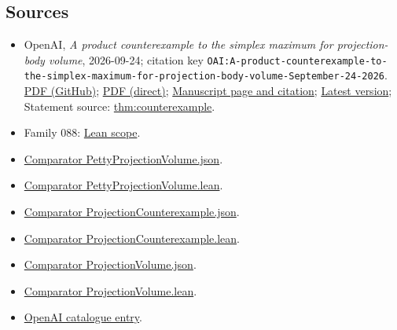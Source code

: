 \documentclass[11pt]{article}
\begin{document}
\subsection{Sources}
\begin{itemize}
\item OpenAI, \emph{A product counterexample to the simplex maximum for projection-body volume}, 2026-09-24; citation key \texttt{OAI:A-product-counterexample-to-the-simplex-maximum-for-projection-body-volume-September-24-2026}. \href{https://github.com/openai/math/blob/adc7f1241b42e322a6451854ab7e4b4c146bf78a/preprints/A-product-counterexample-to-the-simplex-maximum-for-projection-body-volume-September-24-2026/paper.pdf}{PDF (GitHub)}; \href{https://github.com/openai/math/raw/adc7f1241b42e322a6451854ab7e4b4c146bf78a/preprints/A-product-counterexample-to-the-simplex-maximum-for-projection-body-volume-September-24-2026/paper.pdf}{PDF (direct)}; \href{https://github.com/openai/math/blob/adc7f1241b42e322a6451854ab7e4b4c146bf78a/preprints/A-product-counterexample-to-the-simplex-maximum-for-projection-body-volume-September-24-2026/README.md}{Manuscript page and citation}; \href{https://github.com/openai/math/blob/main/preprints/A-product-counterexample-to-the-simplex-maximum-for-projection-body-volume-September-24-2026/paper.pdf}{Latest version}; Statement source: \href{https://github.com/openai/math/blob/adc7f1241b42e322a6451854ab7e4b4c146bf78a/preprints/A-product-counterexample-to-the-simplex-maximum-for-projection-body-volume-September-24-2026/build/main.tex\#L90}{thm:counterexample}.
\item Family 088: \href{https://github.com/openai/math/blob/adc7f1241b42e322a6451854ab7e4b4c146bf78a/lean/docs/088.md}{Lean scope}.
\item \href{https://github.com/openai/math/blob/adc7f1241b42e322a6451854ab7e4b4c146bf78a/lean/ComparatorChallenges/PettyProjectionVolume.json}{Comparator PettyProjectionVolume.json}.
\item \href{https://github.com/openai/math/blob/adc7f1241b42e322a6451854ab7e4b4c146bf78a/lean/ComparatorChallenges/PettyProjectionVolume.lean}{Comparator PettyProjectionVolume.lean}.
\item \href{https://github.com/openai/math/blob/adc7f1241b42e322a6451854ab7e4b4c146bf78a/lean/ComparatorChallenges/ProjectionCounterexample.json}{Comparator ProjectionCounterexample.json}.
\item \href{https://github.com/openai/math/blob/adc7f1241b42e322a6451854ab7e4b4c146bf78a/lean/ComparatorChallenges/ProjectionCounterexample.lean}{Comparator ProjectionCounterexample.lean}.
\item \href{https://github.com/openai/math/blob/adc7f1241b42e322a6451854ab7e4b4c146bf78a/lean/ComparatorChallenges/ProjectionVolume.json}{Comparator ProjectionVolume.json}.
\item \href{https://github.com/openai/math/blob/adc7f1241b42e322a6451854ab7e4b4c146bf78a/lean/ComparatorChallenges/ProjectionVolume.lean}{Comparator ProjectionVolume.lean}.
\item \href{https://github.com/openai/math/blob/adc7f1241b42e322a6451854ab7e4b4c146bf78a/CONTENTS.md}{OpenAI catalogue entry}.
\end{itemize}
\end{document}
